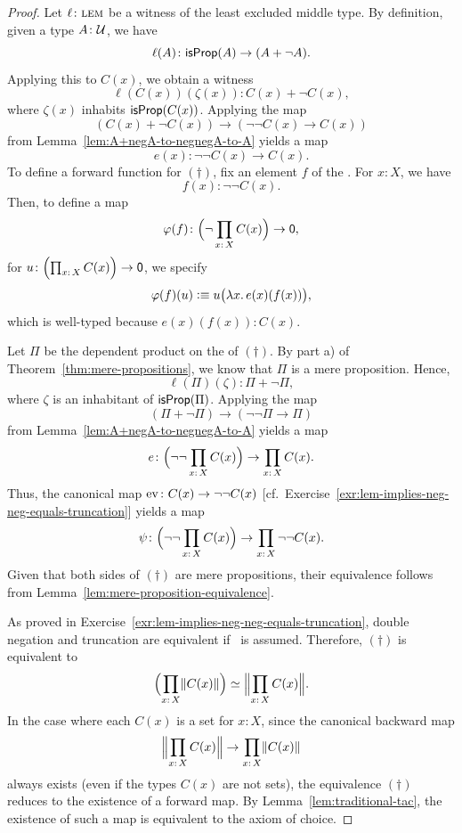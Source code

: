 \begin{proof}
    Let $\ell\colon\Lem$ be a witness of the least excluded middle type. By definition, given a type $A\colon\univ$, we have
    \[
        \ell(A)\colon\fun{isProp}(A)\to(A+\neg A).
    \]
    Applying this to $C(x)$, we obtain a witness
    \[
        \ell(C(x))(\zeta(x))\colon C(x)+\neg C(x),
    \]
    where $\zeta(x)$ inhabits $\mathsf{isProp}(C(x))$. Applying the map
    \[
        (C(x)+\neg C(x))\to(\neg\neg C(x)\to C(x))
    \]
    from Lemma~\ref{lem:A+negA-to-negnegA-to-A} yields a map
    \[
        e(x)\colon\neg\neg C(x)\to C(x).
    \]
    To define a forward function for $(\dag)$, fix an element $f$ of the \lhs. For $x\colon X$, we have
    \[
        f(x)\colon\neg\neg C(x).
    \]
    Then, to define a map
    \[
        \varphi(f)\colon\Bigl(\neg\prod_{x\colon X}C(x)\Bigr)\to\fun0,
    \]
    for $u\colon\Bigl(\prod_{x\colon X}C(x)\Bigr)\to\fun0$, we specify 
    \[
        \varphi(f)(u)\mathrel{\vcentcolon}\equiv u\bigl(\lambda x.\,e(x)(f(x))\bigr),
    \]
    which is well-typed because $e(x)(f(x))\colon C(x)$.

    Let $\Pi$ be the dependent product on the \rhs of $(\dag)$. By part a) of Theorem~\ref{thm:mere-propositions}, we know that $\Pi$ is a mere proposition. Hence,
    \[
        \ell(\Pi)(\zeta)\colon\Pi+\neg\Pi,
    \]
    where $\zeta$ is an inhabitant of $\mathsf{isProp}(\Pi)$. Applying the map
    \[
        (\Pi+\neg\Pi)\to(\neg\neg\Pi\to\Pi)
    \]
    from Lemma~\ref{lem:A+negA-to-negnegA-to-A} yields a map
    \[
        e\colon\Bigl(\neg\neg\prod_{x\colon X}C(x)\Bigr)
            \to\prod_{x\colon X}C(x).
    \]
    Thus, the canonical map $\ev{}\colon C(x)\to\neg\neg C(x)$ [cf.~Exercise~\ref{exr:lem-implies-neg-neg-equals-truncation}] yields a map
    \[
        \psi\colon\Bigl(\neg\neg\prod_{x\colon X}C(x)\Bigr)
            \to\prod_{x\colon X}\neg\neg C(x).
    \]
    Given that both sides of $(\dag)$ are mere propositions, their equivalence follows from Lemma~\ref{lem:mere-proposition-equivalence}.

    As proved in Exercise~\ref{exr:lem-implies-neg-neg-equals-truncation}, double negation and truncation are equivalent if \Lem\ is assumed. Therefore, $(\dag)$ is equivalent to
    \[
        \Bigl(
            \prod_{x\colon X}\lVert C(x)\rVert
        \Bigr)
        \simeq
        \Bigl\lVert
            \prod_{x\colon X}C(x)
        \Bigr\rVert.
    \]
    In the case where each $C(x)$ is a set for $x\colon X$, since the canonical backward map
    \[
        \Bigl\lVert\prod_{x\colon X}C(x)\Bigr\rVert
        \to
        \prod_{x\colon X}\lVert C(x)\rVert
    \]
    always exists (even if the types $C(x)$ are not sets), the equivalence $(\dag)$ reduces to the existence of a forward map. By Lemma~\ref{lem:traditional-tac}, the existence of such a map is equivalent to the axiom of choice.
    
\end{proof}

